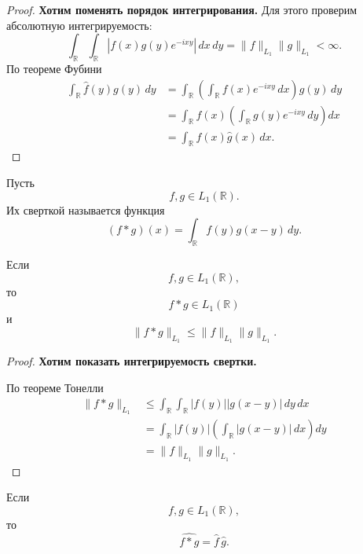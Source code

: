 \begin{proof}
	\textbf{Хотим поменять порядок интегрирования.}
	Для этого проверим абсолютную интегрируемость:
	\[
	\int_{\mathbb R}\int_{\mathbb R}
	|f(x)g(y)e^{-ixy}|\,dx\,dy
	=
	\|f\|_{L_1}\|g\|_{L_1}
	<\infty.
	\]
	По теореме Фубини
	\[
	\begin{aligned}
		\int_{\mathbb R}\widehat f(y)g(y)\,dy
		&=
		\int_{\mathbb R}
		\left(
		\int_{\mathbb R}f(x)e^{-ixy}\,dx
		\right)g(y)\,dy
		\\
		&=
		\int_{\mathbb R}f(x)
		\left(
		\int_{\mathbb R}g(y)e^{-ixy}\,dy
		\right)dx
		\\
		&=
		\int_{\mathbb R}f(x)\widehat g(x)\,dx.
	\end{aligned}
	\]
\end{proof}

\begin{definition}[Свертка]
	Пусть
	\[
	f,g\in L_1(\mathbb R).
	\]
	Их сверткой называется функция
	\[
	(f*g)(x)
	=
	\int_{\mathbb R}f(y)g(x-y)\,dy.
	\]
\end{definition}

\begin{theorem}
	Если
	\[
	f,g\in L_1(\mathbb R),
	\]
	то
	\[
	f*g\in L_1(\mathbb R)
	\]
	и
	\[
	\|f*g\|_{L_1}
	\leq
	\|f\|_{L_1}\|g\|_{L_1}.
	\]
\end{theorem}

\begin{proof}
	\textbf{Хотим показать интегрируемость свертки.}
	
	По теореме Тонелли
	\[
	\begin{aligned}
		\|f*g\|_{L_1}
		&\leq
		\int_{\mathbb R}\int_{\mathbb R}
		|f(y)||g(x-y)|\,dy\,dx
		\\
		&=
		\int_{\mathbb R}|f(y)|
		\left(
		\int_{\mathbb R}|g(x-y)|\,dx
		\right)dy
		\\
		&=
		\|f\|_{L_1}\|g\|_{L_1}.
	\end{aligned}
	\]
\end{proof}

\begin{theorem}
	Если
	\[
	f,g\in L_1(\mathbb R),
	\]
	то
	\[
	\widehat{f*g}
	=
	\widehat f\,\widehat g.
	\]
\end{theorem}

